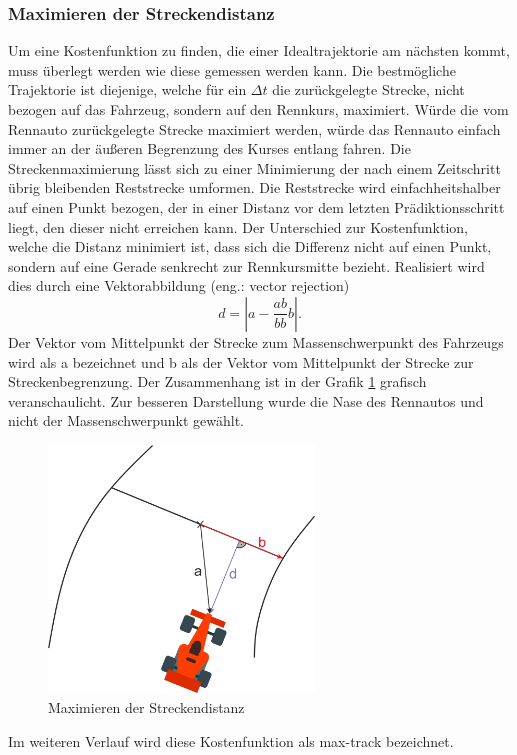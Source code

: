 \documentclass{like}
\begin{document}
\subsubsection*{Maximieren der Streckendistanz}
Um eine Kostenfunktion zu finden, die einer Idealtrajektorie am nächsten kommt, muss überlegt werden wie diese gemessen werden kann. Die bestmögliche Trajektorie ist diejenige, welche für ein $\Delta t$ die zurückgelegte Strecke, nicht bezogen auf das Fahrzeug, sondern auf den Rennkurs, maximiert. Würde die vom Rennauto zurückgelegte Strecke maximiert werden, würde das Rennauto einfach immer an der äußeren Begrenzung des Kurses entlang fahren. Die Streckenmaximierung lässt sich zu einer Minimierung der nach einem Zeitschritt übrig bleibenden Reststrecke umformen. Die Reststrecke wird einfachheitshalber auf einen Punkt bezogen, der in einer Distanz vor dem letzten Prädiktionsschritt liegt, den dieser nicht erreichen kann. Der Unterschied zur Kostenfunktion, welche die Distanz minimiert ist, dass sich die Differenz nicht auf einen Punkt, sondern auf eine Gerade senkrecht zur Rennkursmitte bezieht.
Realisiert wird dies durch eine Vektorabbildung (eng.: vector rejection)
\begin{equation}
	d = |a - \frac{ab}{bb}b|.
\end{equation}
Der Vektor vom Mittelpunkt der Strecke zum Massenschwerpunkt des Fahrzeugs wird als a bezeichnet und b als der Vektor vom Mittelpunkt der Strecke zur Streckenbegrenzung.
Der Zusammenhang ist in der Grafik \ref{fig:maxDist} grafisch  veranschaulicht. Zur besseren Darstellung wurde die Nase des Rennautos und nicht der Massenschwerpunkt gewählt.

\begin{figure}[ht!]
	\centering
	\includegraphics[width=200pt]{Abbildungen/vektorRejection.png}
	\caption{Maximieren der Streckendistanz}
	\label{fig:maxDist}
\end{figure}
Im weiteren Verlauf wird diese Kostenfunktion als max-track bezeichnet.
\end{document}
